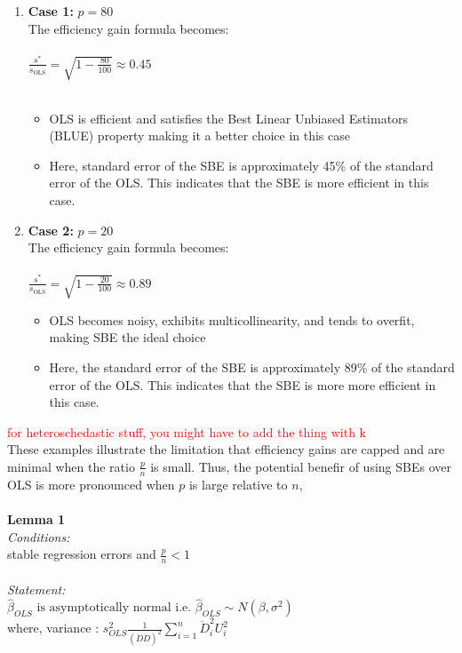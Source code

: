 \begin{enumerate}
    \item \textbf{Case 1:} $p = 80$\\
   The efficiency gain formula becomes:\\
    \\
    $\frac{s^*}{s_{\text{OLS}}} = \sqrt{1 - \frac{80}{100}} \approx 0.45$\\
    \\
    \begin{itemize}
        \item OLS is efficient and satisfies the Best Linear Unbiased Estimators (BLUE) property making it a better choice in this case
        \item Here, standard error of the SBE is approximately 45\% of the standard error of the OLS. This indicates that the SBE is more efficient in this case. 
    \end{itemize}

    
    \item \textbf{Case 2:} $p = 20$\\
    The efficiency gain formula becomes:\\
    \\
    $\frac{s^*}{s_{\text{OLS}}} = \sqrt{1 - \frac{20}{100}} \approx 0.89$\\
    \begin{itemize}
        \item OLS becomes noisy, exhibits multicollinearity, and tends to overfit, making SBE the ideal choice
        \item Here, the standard error of the SBE is approximately 89\% of the standard error of the OLS. This indicates that the SBE is more more efficient in this case. 
    \end{itemize}
   
\end{enumerate}

\textcolor{red}{for heteroschedastic stuff, you might have to add the thing with k}\\
These examples illustrate the limitation that efficiency gains are capped and are minimal when the ratio $\frac{p}{n}$ is small. Thus, the potential benefir of using SBEs over OLS is more pronounced when $p$ is large relative to $n$,
\\
\\
\textbf{Lemma 1} \\
\textit{Conditions:} \\
stable regression errors and $\frac{p}{n} < 1$ \\
\\
\textit{Statement:}\\
$\hat{\beta}_{OLS} \text{ is asymptotically normal i.e. } \hat{\beta}_{OLS} \sim N(\beta, \sigma^2)$\\
\indent
where, variance : $s^2_{OLS} \frac{1}{(\ddot{D} \ddot{D})^2} \sum_{i=1}^{n} \ddot{D}_i^2 U_i^2$

